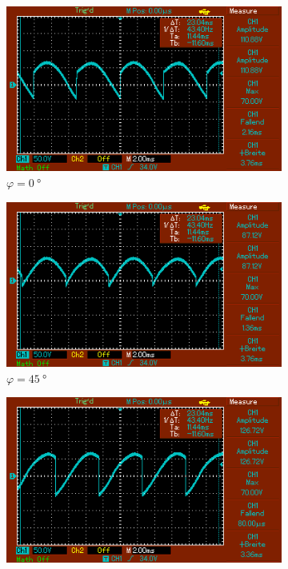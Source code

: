 \begin{figure}
    \centering
    \begin{subfigure}{0.3\textwidth}
        \centering
        \includegraphics[width=\textwidth]{images/1_0.png}
        \caption{$\varphi = \SI{0}{\degree}$}
        \label{fig:1_0}
    \end{subfigure}
    \begin{subfigure}{0.3\textwidth}
        \centering
        \includegraphics[width=\textwidth]{images/1_45.png}
        \caption{$\varphi = \SI{45}{\degree}$}
        \label{fig:1_45}
    \end{subfigure}
    \begin{subfigure}{0.3\textwidth}
        \centering
        \includegraphics[width=\textwidth]{images/1_90.png}

\end{subfigure}
\end{figure}
